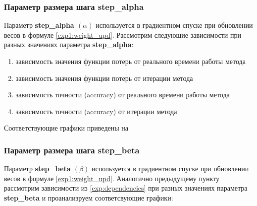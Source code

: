 \documentclass[a4paper, 11pt]{article}
\begin{document}
            \subsubsection{Параметр размера шага \textbf{step\_alpha}}
                Параметр \textbf{step\_alpha $(\alpha)$} используется в градиентном спуске при обновлении весов в формуле \ref{exp1:weight_upd}.
                Рассмотрим следующие зависимости при разных значениях параметра \textbf{step\_alpha}:
                    \begin{enumerate}\label{exp:dependencies}
                        \item зависимость значения функции потерь от реального времени работы метода
                        \item зависимость значения функции потерь от итерации метода
                        \item зависимость точности (accuracy) от реального времени работы метода
                        \item зависимость точности (accuracy) от итерации метода
                     \end{enumerate}
                 Соответствующие графики приведены на
            \subsubsection{Параметр размера шага step\_beta}
                Параметр \textbf{step\_beta $(\beta)$} используется в градиентном спуске при обновлении весов в формуле \ref{exp1:weight_upd}.
                Аналогично предыдущему пункту рассмотрим зависимости из \ref{exp:dependencies} при разных значениях параметра \textbf{step\_beta} и проанализруем соответсвующие графики:
                
            
\end{document}
